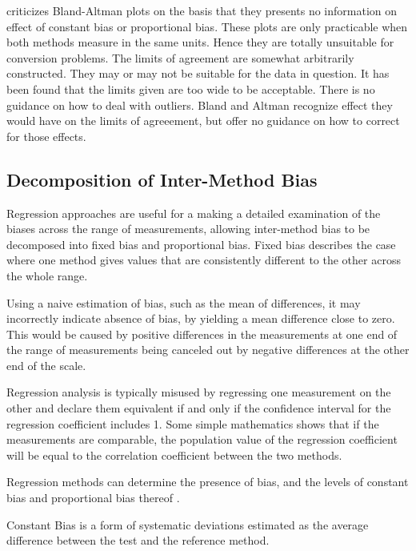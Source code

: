 \documentclass[12pt, a4paper]{report}
\theoremstyle{plain}
\theoremstyle{definition}
\theoremstyle{remark}
\begin{document}
\citet{ludbrook97,ludbrook02} criticizes Bland-Altman plots on the
basis that they presents no information on effect of constant bias
or proportional bias. These plots are only practicable when both
methods measure in the same units. Hence they are totally
unsuitable for conversion problems. The limits of agreement are
somewhat arbitrarily constructed. They may or may not be suitable
for the data in question. It has been found that the limits given
are too wide to be acceptable. There is no guidance on how to deal
with outliers. Bland and Altman recognize effect they would have
on the limits of agreeement, but offer no guidance on how to
correct for those effects.	


\subsection{Decomposition of Inter-Method Bias}
Regression approaches are useful for a making a detailed examination of the biases across the range of measurements, allowing inter-method bias to be decomposed into fixed bias and proportional bias. Fixed bias describes the case where one method gives values that are consistently different to the other across the whole range. 


Using a naive estimation of bias, such as the mean of differences, it may incorrectly indicate absence of bias, by yielding a mean difference close to zero. This would be caused by positive differences in the measurements at one end of the range of measurements being canceled out by negative differences at the other end of the scale.
	
Regression analysis is typically misused by regressing one measurement on the other and declare them equivalent if and only if the confidence interval for the regression coefficient includes 1. Some simple mathematics shows that if the measurements are comparable, the population value of the regression coefficient will be equal to the correlation coefficient between the two methods. 

Regression methods can determine the presence of bias, and the levels of constant bias and proportional bias thereof \cite{ludbrook97,ludbrook02}.


Constant Bias is a form of systematic deviations estimated as the average difference between the test and the reference method. 
 


\end{document}
